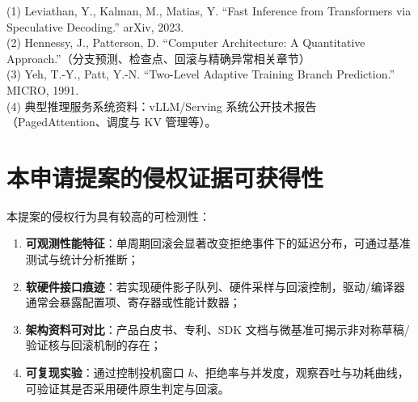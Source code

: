 \documentclass[12pt,a4paper]{article}
\begin{document}
(1) Leviathan, Y., Kalman, M., Matias, Y. ``Fast Inference from Transformers via Speculative Decoding.'' arXiv, 2023. \\
(2) Hennessy, J., Patterson, D. ``Computer Architecture: A Quantitative Approach.''（分支预测、检查点、回滚与精确异常相关章节）\\
(3) Yeh, T.-Y., Patt, Y.-N. ``Two-Level Adaptive Training Branch Prediction.'' MICRO, 1991. \\
(4) 典型推理服务系统资料：vLLM/Serving 系统公开技术报告（PagedAttention、调度与 KV 管理等）。

\section{本申请提案的侵权证据可获得性}

本提案的侵权行为具有较高的可检测性：
\begin{enumerate}
    \item \textbf{可观测性能特征}：单周期回滚会显著改变拒绝事件下的延迟分布，可通过基准测试与统计分析推断；
    \item \textbf{软硬件接口痕迹}：若实现硬件影子队列、硬件采样与回滚控制，驱动/编译器通常会暴露配置项、寄存器或性能计数器；
    \item \textbf{架构资料可对比}：产品白皮书、专利、SDK 文档与微基准可揭示非对称草稿/验证核与回滚机制的存在；
    \item \textbf{可复现实验}：通过控制投机窗口 $k$、拒绝率与并发度，观察吞吐与功耗曲线，可验证其是否采用硬件原生判定与回滚。
\end{enumerate}
\end{document}
